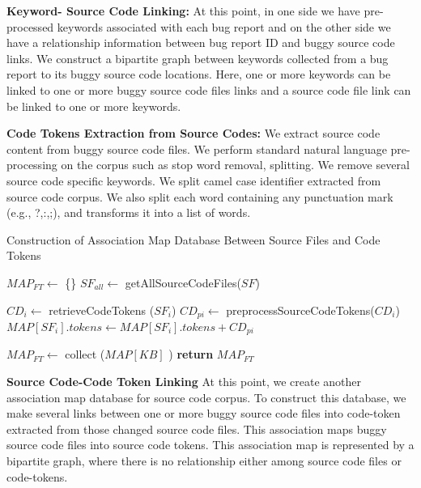 \documentclass{sig-alternate}
\begin{document}
\textbf{Keyword- Source Code Linking:}
At this point, in one side we have pre-processed keywords associated with each bug report and on the other side we have a relationship information between bug report ID and buggy source code links. We construct a bipartite graph between keywords collected from a bug report to its buggy source code locations. Here, one or more keywords can be linked to one or more buggy source code files links and a source code file link can be linked to one or more keywords.

\textbf{Code Tokens Extraction from Source Codes:}
We extract source code content from buggy source code files. We perform standard natural language pre-processing on the corpus such as stop word removal, splitting. We remove several source code specific keywords. We split camel case identifier extracted from source code corpus. We also split each word containing any punctuation mark (e.g., ?,:,;), and transforms it into a list of words.

\begin{algorithm}[!t]
\caption{Construction of Association Map Database Between Source Files and Code Tokens}
\label{mapsfandct}
\begin{algorithmic}[1]
\State $MAP_{FT} \gets$ \{\}
\State $SF_{all} \gets$ getAllSourceCodeFiles($SF$)


\State $CD_{i} \gets$ retrieveCodeTokens ($SF_i$)
\State $CD_{pi} \gets$ preprocessSourceCodeTokens($CD_{i}$)
\State $MAP[SF_i].tokens \gets MAP[SF_{i}].tokens + CD_{pi}$
\EndFor

\State $MAP_{FT} \gets$ collect ($MAP[KB]$ )
\State \textbf{return} $MAP_{FT}$
\EndProcedure
\end{algorithmic}
\end{algorithm}

\textbf{Source Code-Code Token Linking}
At this point, we create another association map database for source code corpus. To construct this database, we make several links between one or more buggy source code files into code-token extracted from those changed source code files. This association maps buggy source code files into source code tokens. This association map is represented by a bipartite graph, where there is no relationship either among source code files or code-tokens.  
\end{document}
